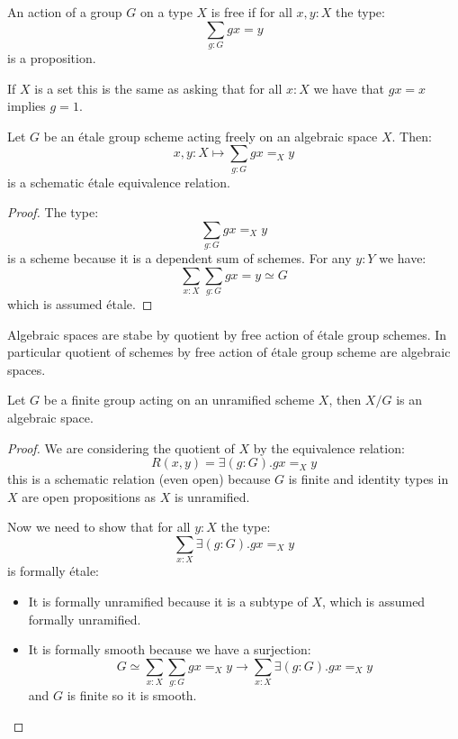 \begin{definition}
An action of a group $G$ on a type $X$ is free if for all $x,y:X$ the type:
\[\sum_{g:G}gx=y\]
 is a proposition.
\end{definition}

If $X$ is a set this is the same as asking that for all $x:X$ we have that $gx=x$ implies $g=1$.

\begin{lemma}
Let $G$ be an étale group scheme acting freely on an algebraic space $X$. Then:
\[x,y:X \mapsto \sum_{g:G}gx=_Xy\]
is a schematic étale equivalence relation.
\end{lemma}

\begin{proof}
The type:
\[\sum_{g:G}gx=_Xy\]
is a scheme because it is a dependent sum of schemes. For any $y:Y$ we have:
\[\sum_{x:X}\sum_{g:G}gx=y \simeq G\]
which is assumed étale.
\end{proof}

\begin{corollary}
Algebraic spaces are stabe by quotient by free action of étale group schemes. In particular quotient of schemes by free action of étale group scheme are algebraic spaces.
\end{corollary}

\begin{lemma}
Let $G$ be a finite group acting on an unramified scheme $X$, then $X/G$ is an algebraic space.
\end{lemma}

\begin{proof}
We are considering the quotient of $X$ by the equivalence relation:
\[R(x,y) = \exists (g:G). gx=_Xy\]
this is a schematic relation (even open) because $G$ is finite and identity types in $X$ are open propositions as $X$ is unramified. 

Now we need to show that for all $y:X$ the type:
\[\sum_{x:X}\exists (g:G). gx=_Xy\]
is formally étale:
\begin{itemize}
\item It is formally unramified because it is a subtype of $X$, which is assumed formally unramified.
\item It is formally smooth because we have a surjection:
\[G \simeq \sum_{x:X}\sum_{g:G} gx=_Xy \to \sum_{x:X}\exists (g:G). gx=_Xy\]
and $G$ is finite so it is smooth.
\end{itemize}
\end{proof}
